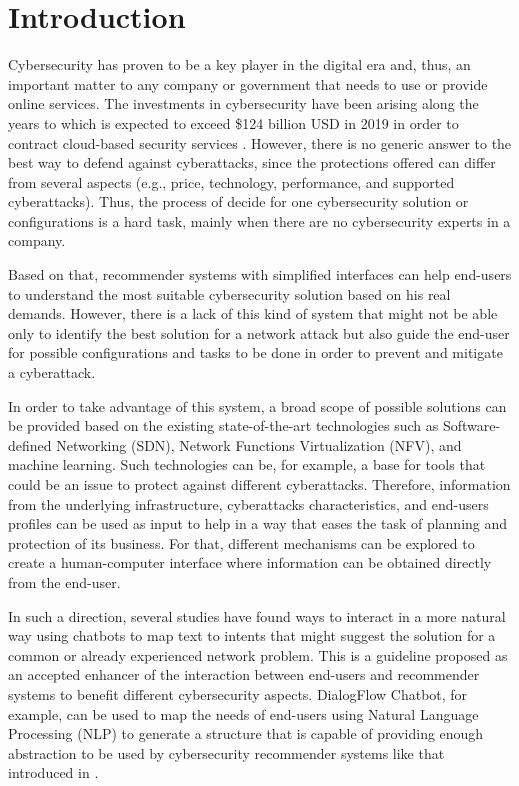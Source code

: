 \chapter{Introduction}
Cybersecurity has proven to be a key player in the digital era and, thus, an important matter to any company or government that needs to use or provide online services. The investments in cybersecurity have been arising along the years to which is expected to exceed \$124 billion USD in 2019 in order to contract cloud-based security services \cite{GrowthForecast}. However, there is no generic answer to the best way to defend against cyberattacks, since the protections offered can differ from several aspects (e.g., price, technology, performance, and supported cyberattacks). Thus, the process of decide for one cybersecurity solution or configurations is a hard task, mainly when there are no cybersecurity experts in a company.

Based on that, recommender systems with simplified interfaces can help end-users to understand the most suitable cybersecurity solution based on his real demands. However, there is a lack of this kind of system that might not be able only to identify the best solution for a network attack but also guide the end-user for possible configurations and tasks to be done in order to prevent and mitigate a cyberattack.

In order to take advantage of this system, a broad scope of possible solutions can be provided based on the existing state-of-the-art technologies such as Software-defined Networking (SDN), Network Functions Virtualization (NFV), and machine learning. Such technologies can be, for example, a base for tools that could be an issue to protect against different cyberattacks. Therefore, information from the underlying infrastructure, cyberattacks characteristics, and end-users profiles can be used as input to help in a way that eases the task of planning and protection of its business. For that, different mechanisms can be explored to create a human-computer interface where information can be obtained directly from the end-user.

In such a direction, several studies have found ways to interact in a more natural way using chatbots \cite{networkIntents} to map text to intents that might suggest the solution for a common or already experienced network problem. This is a guideline proposed as an accepted enhancer of the interaction between end-users and recommender systems to benefit different cybersecurity aspects. DialogFlow Chatbot, for example, can be used to map the needs of end-users using Natural Language Processing (NLP) to generate a structure that is capable of providing enough abstraction to be used by cybersecurity recommender systems like that introduced in \cite{MENTOR}.


